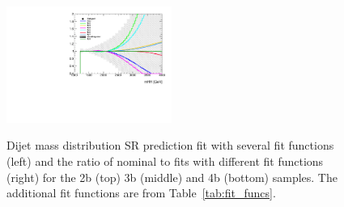 \begin{figure}[htbp!]
\begin{center}
\includegraphics[angle=270, width=0.48\textwidth]{figures/boosted/Syst_Smooth/smoothFuncCompare_44_comp_ratio.pdf} \\
\caption{ Dijet mass distribution SR prediction fit with several fit functions (left) and the ratio of nominal to fits with different fit functions (right)  for the 2b (top) 3b (middle) and 4b (bottom) samples. The additional fit functions are from Table~\ref{tab:fit_funcs}.}
\label{fig:qcd_fit_funcs_sys}
\end{center}
\end{figure}

